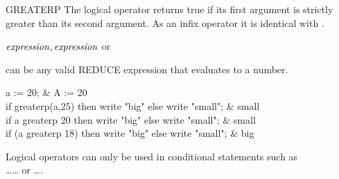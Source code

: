 \begin{Operator}[greaterp]{GREATERP}
The  logical operator returns true if its first argument is
strictly greater than its second argument.  As an infix operator it is
identical with \name{>}.
\begin{Syntax}
\(\meta{expression},\meta{expression}\) or 
 
\end{Syntax}

 can be any valid REDUCE expression that evaluates to a
number.

\begin{Examples}

a := 20;                     &          A := 20 \\
if greaterp(a,25) then write "big" else write "small";
			     &          small \\
if a greaterp 20 then write "big" else write "small";
			     &          small \\
if (a greaterp 18) then write "big" else write "small";
			     &          big
\end{Examples}

\begin{Comments}
Logical operators can only be used in conditional statements such as \\
\ldots{}\ldots{} 
or \ldots{}.
\end{Comments}
\end{Operator}


